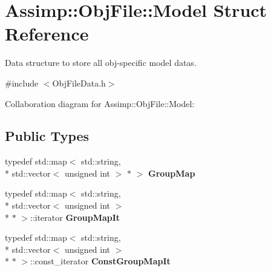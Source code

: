 \hypertarget{struct_assimp_1_1_obj_file_1_1_model}{\section{Assimp\+:\+:Obj\+File\+:\+:Model Struct Reference}
\label{struct_assimp_1_1_obj_file_1_1_model}
}


Data structure to store all obj-\/specific model datas.  




{\ttfamily \#include $<$Obj\+File\+Data.\+h$>$}



Collaboration diagram for Assimp\+:\+:Obj\+File\+:\+:Model\+:
\subsection*{Public Types}
\begin{DoxyCompactItemize}
\item 
\hypertarget{struct_assimp_1_1_obj_file_1_1_model_a9884baa1895f7d8b6448fc76ca06b7a1}{typedef std\+::map$<$ std\+::string, \\*
std\+::vector$<$ unsigned int $>$ $\ast$ $>$ {\bfseries Group\+Map}}\label{struct_assimp_1_1_obj_file_1_1_model_a9884baa1895f7d8b6448fc76ca06b7a1}

\item 
\hypertarget{struct_assimp_1_1_obj_file_1_1_model_a7bda993ee43b71f5f9a919cd72f699e1}{typedef std\+::map$<$ std\+::string, \\*
std\+::vector$<$ unsigned int $>$\\*
 $\ast$ $>$\+::iterator {\bfseries Group\+Map\+It}}\label{struct_assimp_1_1_obj_file_1_1_model_a7bda993ee43b71f5f9a919cd72f699e1}

\item 
\hypertarget{struct_assimp_1_1_obj_file_1_1_model_add07cff247d2b932873e9e9d8810abc3}{typedef std\+::map$<$ std\+::string, \\*
std\+::vector$<$ unsigned int $>$\\*
 $\ast$ $>$\+::const\+\_\+iterator {\bfseries Const\+Group\+Map\+It}}\label{struct_assimp_1_1_obj_file_1_1_model_add07cff247d2b932873e9e9d8810abc3}

\end{DoxyCompactItemize}
